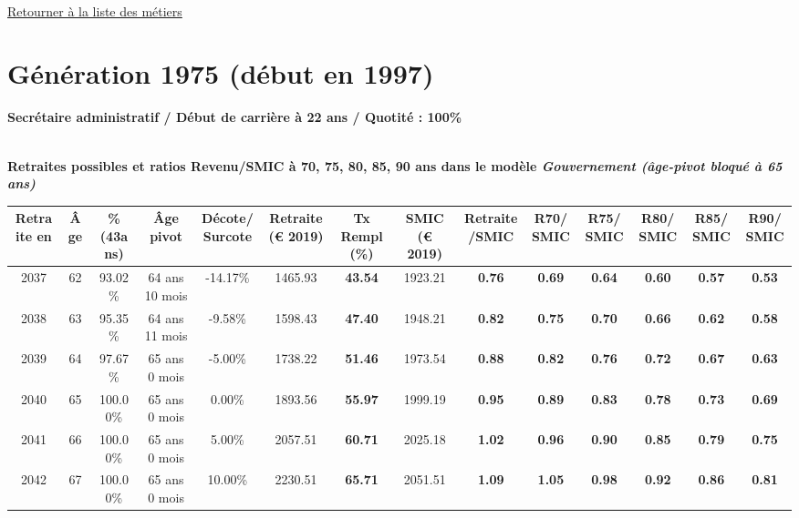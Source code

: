 ~\\ 
 
 \hyperlink{page.2}{\noindent Retourner à la liste des métiers}

 \newpage 

\section{Génération 1975 (début en 1997)\label{SecretaireAdmin_100_22_1975_0}} 
 
{\bf \noindent Secrétaire administratif / Début de carrière à 22 ans / Quotité : 100\%}  ~ 

 ~\\{\bf \noindent Retraites possibles et ratios Revenu/SMIC à 70, 75, 80, 85, 90 ans dans le modèle \emph{Gouvernement (âge-pivot bloqué à 65 ans)}}  
 
\begin{adjustbox}{max width=\textwidth} 
\begin{tabular}[htb]{|c|c||c|c|c||c|c||c|c||c|c|c|c|c|} 
\hline 
 Retraite en &  Âge &  \%(43ans) &  Âge pivot &  Décote/Surcote &  Retraite (\euro{} 2019) &  Tx Rempl(\%) &  SMIC (\euro{} 2019) &  Retraite/SMIC &  R70/SMIC &  R75/SMIC &  R80/SMIC &  R85/SMIC &  R90/SMIC \\ 
\hline \hline 
 2037 &  62 &  93.02\% &  64 ans 10 mois &  -14.17\% &  1465.93 &  {\bf 43.54} &  1923.21 &  {\bf {\color{red} 0.76}} &  {\bf {\color{red} 0.69}} &  {\bf {\color{red} 0.64}} &  {\bf {\color{red} 0.60}} &  {\bf {\color{red} 0.57}} &  {\bf {\color{red} 0.53}} \\ 
\hline 
 2038 &  63 &  95.35\% &  64 ans 11 mois &  -9.58\% &  1598.43 &  {\bf 47.40} &  1948.21 &  {\bf {\color{red} 0.82}} &  {\bf {\color{red} 0.75}} &  {\bf {\color{red} 0.70}} &  {\bf {\color{red} 0.66}} &  {\bf {\color{red} 0.62}} &  {\bf {\color{red} 0.58}} \\ 
\hline 
 2039 &  64 &  97.67\% &  65 ans 0 mois &  -5.00\% &  1738.22 &  {\bf 51.46} &  1973.54 &  {\bf {\color{red} 0.88}} &  {\bf {\color{red} 0.82}} &  {\bf {\color{red} 0.76}} &  {\bf {\color{red} 0.72}} &  {\bf {\color{red} 0.67}} &  {\bf {\color{red} 0.63}} \\ 
\hline 
 2040 &  65 &  100.00\% &  65 ans 0 mois &  0.00\% &  1893.56 &  {\bf 55.97} &  1999.19 &  {\bf {\color{red} 0.95}} &  {\bf {\color{red} 0.89}} &  {\bf {\color{red} 0.83}} &  {\bf {\color{red} 0.78}} &  {\bf {\color{red} 0.73}} &  {\bf {\color{red} 0.69}} \\ 
\hline 
 2041 &  66 &  100.00\% &  65 ans 0 mois &  5.00\% &  2057.51 &  {\bf 60.71} &  2025.18 &  {\bf 1.02} &  {\bf {\color{red} 0.96}} &  {\bf {\color{red} 0.90}} &  {\bf {\color{red} 0.85}} &  {\bf {\color{red} 0.79}} &  {\bf {\color{red} 0.75}} \\ 
\hline 
 2042 &  67 &  100.00\% &  65 ans 0 mois &  10.00\% &  2230.51 &  {\bf 65.71} &  2051.51 &  {\bf 1.09} &  {\bf 1.05} &  {\bf {\color{red} 0.98}} &  {\bf {\color{red} 0.92}} &  {\bf {\color{red} 0.86}} &  {\bf {\color{red} 0.81}} \\ 
\hline 
\hline 
\end{tabular} 
\end{adjustbox} 
 
